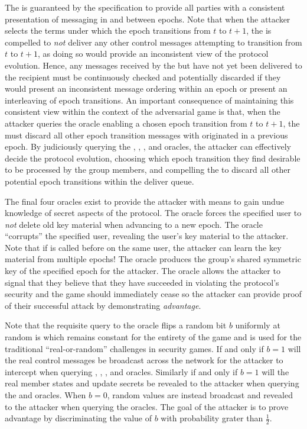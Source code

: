 The  is guaranteed by the  specification to provide all parties with a consistent presentation of messaging in and between epochs.
Note that when the attacker selects the terms under which the epoch transitions from \(t\) to \(t+1\), the  is compelled to \emph{not} deliver any other control messages attempting to transition from \(t\) to \(t+1\), as doing so would provide an inconsistent view of the protocol evolution.
Hence, any messages received by the  but have not yet been delivered to the recipient must be continuously checked and potentially discarded if they would present an inconsistent message ordering within an epoch or present an interleaving of epoch transitions.
An important consequence of maintaining this consistent view within the context of the adversarial  game is that, when the attacker queries the  oracle enabling a chosen epoch transition from \(t\) to \(t+1\), the  must discard all other epoch transition messages with originated in a previous epoch.
By judiciously querying the , , , and  oracles, the attacker can effectively decide the protocol evolution, choosing which epoch transition they find desirable to be processed by the group members, and compelling the  to discard all other potential epoch transitions within the deliver queue.

The final four oracles exist to provide the attacker with means to gain undue knowledge of secret aspects of the  protocol.
The  oracle forces the specified user to \emph{not} delete old key material when advancing to a new epoch.
The  oracle ``corrupts'' the specified user, revealing the user's key material to the attacker. Note that if  is called before  on the same user, the attacker can learn the key material from multiple epochs!
The  oracle produces the group's shared symmetric key of the specified epoch for the attacker.
The  oracle allows the attacker to signal that they believe that they have succeeded in violating the  protocol's security and the game should immediately cease so the attacker can provide proof of their successful attack by demonstrating \emph{advantage}.

Note that the requisite query to the  oracle flips a random bit \(b\) uniformly at random is which remains constant for the entirety of the game and is used for the traditional ``real-or-random'' challenges in security games.
If and only if \(b=1\) will the real control messages be broadcast across the network for the attacker to intercept when querying , , , and  oracles.
Similarly if and only if \(b=1\) will the real member states and update secrets be revealed to the attacker when querying the  and  oracles.
When \(b=0\), random values are instead broadcast and revealed to the attacker when querying the oracles.
The goal of the attacker is to prove advantage by discriminating the value of \(b\) with probability grater than \(\frac{1}{2}\).

